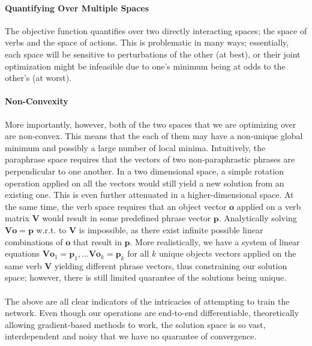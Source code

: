 \documentclass[a4paper,11pt]{article}
\begin{document}
\paragraph{Quantifying Over Multiple Spaces}
The objective function quantifies over two directly interacting spaces; the space of verbs and the space of actions. This is problematic in many ways; essentially, each space will be sensitive to perturbations of the other (at best), or their joint optimization might be infeasible due to one's minimum being at odds to the other's (at worst).

\paragraph{Non-Convexity}
More importantly, however, both of the two spaces that we are optimizing over are non-convex. This means that the each of them may have a non-unique global minimum and possibly a large number of local minima. Intuitively, the paraphrase space requires that the vectors of two non-paraphrastic phrases are perpendicular to one another. In a two dimensional space, a simple rotation operation applied on all the vectors would still yield a new solution from an existing one. This is even further attenuated in a higher-dimensional space. At the same time, the verb space requires that an object vector $\mathbf{o}$ applied on a verb matrix $\mathbf{V}$ would result in some predefined phrase vector $\mathbf{p}$. Analytically solving $\mathbf{V}\mathbf{o}=\mathbf{p}$ w.r.t. to $\mathbf{V}$ is impossible, as there exist infinite possible linear combinations of $\mathbf{o}$ that result in $\mathbf{p}$. More realistically, we have a system of linear equations $\mathbf{V}\mathbf{o}_1 = \mathbf{p}_1, \dots \mathbf{V}\mathbf{o}_k=\mathbf{p}_k$ for all $k$ unique objects vectors applied on the same verb $\mathbf{V}$ yielding different phrase vectors, thus constraining our solution space; however, there is still limited quarantee of the solutions being unique.

\paragraph{}
The above are all clear indicators of the intricacies of attempting to train the network. Even though our operations are end-to-end differentiable, theoretically allowing gradient-based methods to work, the solution space is so vast, interdependent and noisy that we have no quarantee of convergence.




\end{document}
